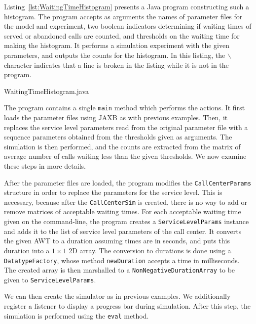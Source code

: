 Listing~\ref{lst:WaitingTimeHistogram}
presents a Java program constructing such a histogram.
The program accepts as arguments the names of parameter
files for the model and experiment,
two boolean indicators determining if waiting times of served
or abandoned calls are counted,
and thresholds on the waiting time for making the histogram.
It performs a simulation experiment with the given parameters,
and outputs the counts for the histogram.
In this listing, the $\backslash$ character indicates that a line
is broken in the listing while it is not in the program.


{WaitingTimeHistogram.java}

The program contains a single \texttt{main} method which performs
the actions.
It first loads the parameter files using JAXB as with previous
examples.
Then, it replaces the service level
parameters read from the original
parameter file with a sequence
parameters obtained
from the thresholds given as arguments.
The simulation is then performed, and
the counts are extracted from the matrix of average number of calls
waiting less than the given thresholds.
We now examine these steps in more details.

After the parameter files are loaded, the program modifies
the \texttt{Call\-Center\-Params} structure in order to replace the
parameters
for the service level.
This is necessary, because after the \texttt{Call\-Center\-Sim} is
created, there is no way to add or remove matrices of acceptable
waiting times.
For each acceptable waiting time given on the command-line,
the program creates a \texttt{Service\-Level\-Params} instance and
adds it to the list of service level parameters of the call center.
It converts the given AWT to a duration assuming times are in seconds,
and puts this duration into a $1\times 1$ 2D array.
The conversion to durations is done using a
\texttt{Datatype\-Factory}, whose method \texttt{new\-Duration} accepts
a time in milliseconds.
The created array is then marshalled to a
\texttt{Non\-Negative\-Duration\-Array} to be given to
\texttt{Service\-Level\-Params}.

We can then create the simulator as in previous examples.
We additionally register a listener to display a progress bar during
simulation.
After this step, the simulation is performed using the \texttt{eval}
method.

